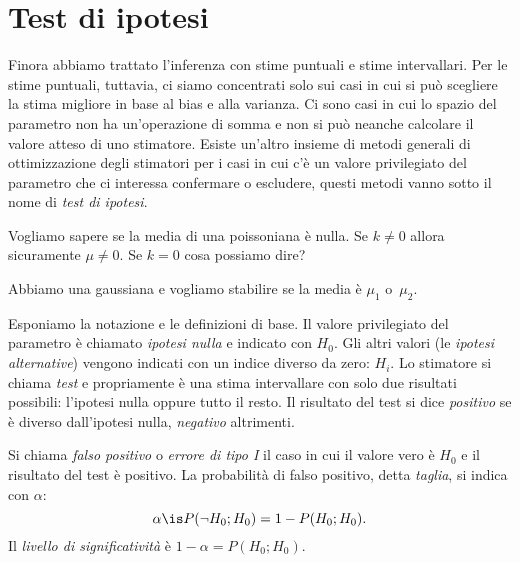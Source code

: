 
\section{Test di ipotesi}

Finora abbiamo trattato l'inferenza con stime puntuali e stime intervallari.
Per le stime puntuali, tuttavia,
ci siamo concentrati solo sui casi in cui si può scegliere la stima migliore in base al bias e alla varianza.
Ci sono casi in cui lo spazio del parametro non ha un'operazione di somma
e non si può neanche calcolare il valore atteso di uno stimatore.
Esiste un'altro insieme di metodi generali di ottimizzazione degli stimatori
per i casi in cui c'è un valore privilegiato del parametro che ci interessa confermare o escludere,
questi metodi vanno sotto il nome di \emph{test di ipotesi}.

\begin{example}
	Vogliamo sapere se la media di una poissoniana è nulla.
	Se $k\neq 0$ allora sicuramente $\mu\neq 0$.
	Se $k=0$ cosa possiamo dire?
\end{example}

\begin{example}
	Abbiamo una gaussiana e vogliamo stabilire se la media è $\mu_1$ o~$\mu_2$.
\end{example}

Esponiamo la notazione e le definizioni di base.
Il valore privilegiato del parametro è chiamato \emph{ipotesi nulla} e indicato con $H_0$.
Gli altri valori (le \emph{ipotesi alternative}) vengono indicati con un indice diverso da zero: $H_i$.
Lo stimatore si chiama \emph{test} e propriamente è una stima intervallare
con solo due risultati possibili: l'ipotesi nulla oppure tutto il resto.
Il risultato del test si dice \emph{positivo} se è diverso dall'ipotesi nulla,
\emph{negativo} altrimenti.

\begin{definition}
	Si chiama \emph{falso positivo} o \emph{errore di tipo I}
	il caso in cui il valore vero è $H_0$ e il risultato del test è positivo.
	La probabilità di falso positivo, detta \emph{taglia}, si indica con $\alpha$:
	\begin{equation*}
		\alpha
		\is P(\neg H_0;H_0) = 1 - P(H_0;H_0).
	\end{equation*}
	Il \emph{livello di significatività} è $1-\alpha = P(H_0;H_0)$.
\end{definition}

